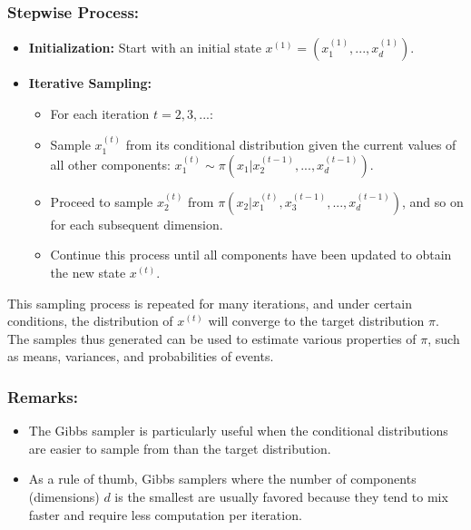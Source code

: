 \documentclass{article}
\begin{document}
\subsubsection{Stepwise Process:}
\begin{itemize}
    \item \textbf{Initialization:} Start with an initial state \( x^{(1)} = (x^{(1)}_1, ..., x^{(1)}_d) \).
    \item  \textbf{Iterative Sampling:}
    \begin{itemize}
        \item For each iteration \( t = 2, 3, ... \):
    \end{itemize}
    \begin{itemize}
        \item Sample \( x^{(t)}_1 \) from its conditional distribution given the current values of all other components: \( x^{(t)}_1 \sim \pi(x_1 | x^{(t-1)}_2, ..., x^{(t-1)}_d) \). 
    \end{itemize}
    \begin{itemize}
        \item Proceed to sample \( x^{(t)}_2 \) from \( \pi(x_2 | x^{(t)}_1, x^{(t-1)}_3, ..., x^{(t-1)}_d) \), and so on for each subsequent dimension.
    \end{itemize}
    \begin{itemize}
        \item Continue this process until all components have been updated to obtain the new state \( x^{(t)} \).
    \end{itemize}
\end{itemize}


This sampling process is repeated for many iterations, and under certain conditions, the distribution of \( x^{(t)} \) will converge to the target distribution \( \pi \). The samples thus generated can be used to estimate various properties of \( \pi \), such as means, variances, and probabilities of events.

\subsubsection{Remarks:}
\begin{itemize}
    \item The Gibbs sampler is particularly useful when the conditional distributions are easier to sample from than the target distribution.
    \item As a rule of thumb, Gibbs samplers where the number of components (dimensions) \( d \) is the smallest are usually favored because they tend to mix faster and require less computation per iteration.
\end{itemize}
\end{document}
